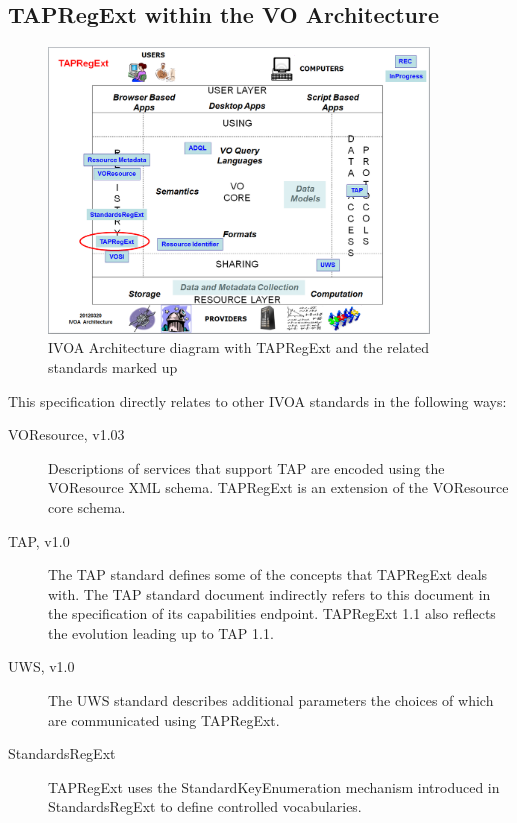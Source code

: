 \documentclass{ivoa}
\begin{document}
\subsection{TAPRegExt within the VO Architecture}

\label{architecture}

\begin{figure}[thm]
\begin{center}
\includegraphics[width=0.9\textwidth]{TAPRegExt-arch.png}
\end{center}
\caption{IVOA Architecture diagram with TAPRegExt and
the related standards marked up}
\label{fig:arch}
\end{figure}

This specification directly relates to other IVOA standards in the following
ways:


\begin{description}
\item[VOResource, v1.03 \citep{std:VOR}] Descriptions of services that support TAP are encoded
using the VOResource XML schema. TAPRegExt is an extension 
of the VOResource core schema.
\item[TAP, v1.0 \citep{std:TAP}]The TAP standard defines some of the concepts that TAPRegExt
deals with. The TAP standard document indirectly
refers to this document in the specification of its capabilities endpoint.
TAPRegExt 1.1 also reflects the evolution leading up to TAP 1.1.
\item[UWS, v1.0 \citep{std:UWS}]The UWS standard describes additional parameters the choices 
of which are communicated using TAPRegExt.
\item[StandardsRegExt \citep{std:STDREGEXT}] TAPRegExt uses the StandardKeyEnumeration mechanism introduced
in StandardsRegExt to define controlled vocabularies.

\end{description}
\end{document}
